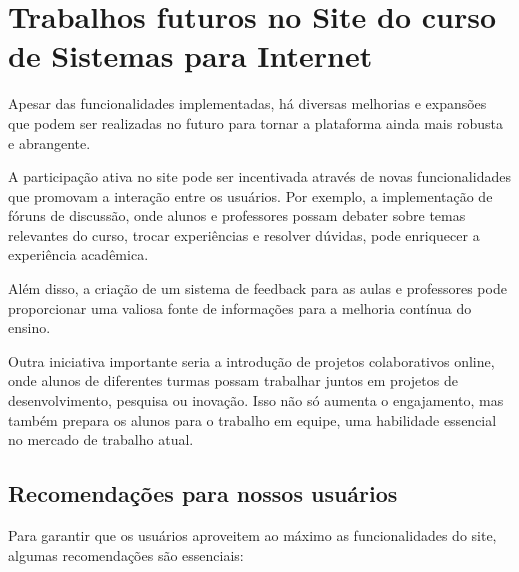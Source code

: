 \documentclass[a4paper,12pt]{report}
\begin{document}
\section{Trabalhos futuros no Site do curso de Sistemas para Internet} 
Apesar das funcionalidades implementadas, há diversas melhorias e expansões que podem ser realizadas no futuro para tornar a plataforma ainda mais robusta e abrangente. 

A participação ativa no site pode ser incentivada através de novas funcionalidades que promovam a interação entre os usuários. Por exemplo, a implementação de fóruns de discussão, onde alunos e professores possam debater sobre temas relevantes do curso, trocar experiências e resolver dúvidas, pode enriquecer a experiência acadêmica.  

Além disso, a criação de um sistema de feedback para as aulas e professores pode proporcionar uma valiosa fonte de informações para a melhoria contínua do ensino. 

Outra iniciativa importante seria a introdução de projetos colaborativos online, onde alunos de diferentes turmas possam trabalhar juntos em projetos de desenvolvimento, pesquisa ou inovação. Isso não só aumenta o engajamento, mas também prepara os alunos para o trabalho em equipe, uma habilidade essencial no mercado de trabalho atual. 

\subsection{Recomendações para nossos usuários} 
Para garantir que os usuários aproveitem ao máximo as funcionalidades do site, algumas recomendações são essenciais: 
\end{document}
